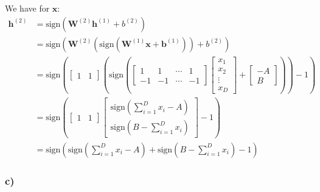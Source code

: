 \documentclass[11pt]{article}
\begin{document}
We have for $\bm{x}$:
\begin{align*}
  \bm{h}^{(2)} &= \text{sign} \left( \bm{W}^{(2)}\bm{h}^{(1)} + b^{(2)} \right) \\
               &= \text{sign} \left( \bm{W}^{(2)} \left( \text{sign} \left( \bm{W}^{(1)} \bm{x} + \bm{b}^{(1)} \right) \right) + b^{(2)} \right) \\
               &= \text{sign} \left( \begin{bmatrix}
                                       1  &1
                                     \end{bmatrix} \left( \text{sign} \left( \begin{bmatrix}
                                                                               1  &1  &\cdots &1 \\
                                                                               -1 &-1 &\cdots &-1
                                                                             \end{bmatrix}
                 \begin{bmatrix}
                   x_{1} \\
                   x_{2} \\
                   \vdots \\
                   x_{D}
                 \end{bmatrix} + \begin{bmatrix}
                                   -A \\
                                   B
                                 \end{bmatrix} \right) \right) -1 \right) \\
               &= \text{sign} \left( \begin{bmatrix}
                                       1  &1
                                     \end{bmatrix} \begin{bmatrix}
                                                                               \text{sign} \left( \sum_{i = 1}^{D} x_{i} - A \right) \\
                                                                               \text{sign} \left( B - \sum_{i = 1}^{D} x_{i} \right)
                                                          \end{bmatrix} -1 \right) \\
               &= \text{sign} \left( \text{sign} \left( \sum_{i = 1}^{D} x_{i} - A \right) + \text{sign} \left( B - \sum_{i = 1}^{D} x_{i} \right) -1 \right)
\end{align*}
\subsubsection{c)}
\end{document}

